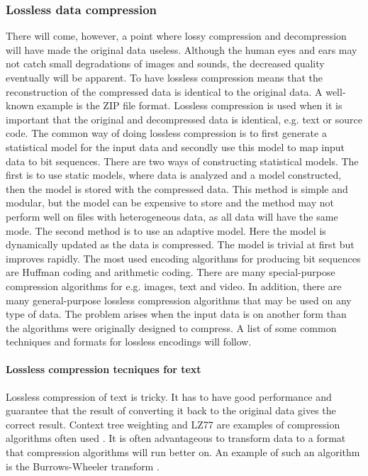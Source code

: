 \subsubsection{Lossless data compression}
There will come, however, a point where lossy compression and decompression will have made the original data useless. Although the human eyes and ears may not catch small degradations of images and sounds, the decreased quality eventually will be apparent.
\newline
\newline
To have lossless compression means that the reconstruction of the compressed data is identical to the original data. A well-known example is the ZIP file format. Lossless compression is used when it is important that the original and decompressed data is identical, e.g. text or source code. The common way of doing lossless compression is to first generate a statistical model for the input data and secondly use this model to map input data to bit sequences. There are two ways of constructing statistical models. The first is to use static models, where data is analyzed and a model constructed, then the model is stored with the compressed data. This method is simple and modular, but the model can be expensive to store and the method may not perform well on files with heterogeneous data, as all data will have the same mode. The second method is to use an adaptive model. Here the model is dynamically updated as the data is compressed. The model is trivial at first but improves rapidly.
\newline
\newline
The most used encoding algorithms for producing bit sequences are Huffman coding and arithmetic coding. There are many special-purpose compression algorithms for e.g. images, text and video. In addition, there are many general-purpose lossless compression algorithms that may be used on any type of data. The problem arises when the input data is on another form than the algorithms were originally designed to compress.
A list of some common techniques and formats for lossless encodings will follow. \cite{bib:losslessCompression}


\paragraph{Lossless compression tecniques for text} \hfill \newline

Lossless compression of text is tricky. It has to have good performance and guarantee that the result of converting it back to the original data gives the correct result. Context tree weighting and LZ77 are examples of compression algorithms often used  \cite{bib:contextTreeWeightingResearch}. It is often advantageous to transform data to a format that compression algorithms will run better on. An example of such an algorithm is the Burrows-Wheeler transform \cite{bib:burrowsWheelerTransform}. 


